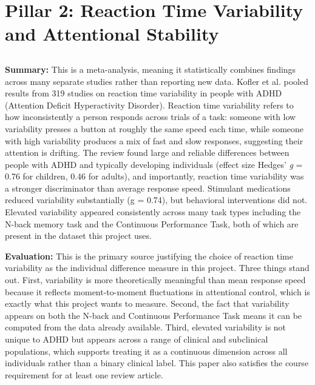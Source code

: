 \documentclass[12pt]{article}
\begin{document}
\section*{Pillar 2: Reaction Time Variability and Attentional Stability}

\subsection*{\cite{kofler2013}}
\textbf{Summary:} This is a meta-analysis, meaning it statistically combines findings across many separate studies rather than reporting new data. Kofler et al. pooled results from 319 studies on reaction time variability in people with ADHD (Attention Deficit Hyperactivity Disorder). Reaction time variability refers to how inconsistently a person responds across trials of a task: someone with low variability presses a button at roughly the same speed each time, while someone with high variability produces a mix of fast and slow responses, suggesting their attention is drifting. The review found large and reliable differences between people with ADHD and typically developing individuals (effect size Hedges' \textit{g} = 0.76 for children, 0.46 for adults), and importantly, reaction time variability was a stronger discriminator than average response speed. Stimulant medications reduced variability substantially (g = 0.74), but behavioral interventions did not. Elevated variability appeared consistently across many task types including the N-back memory task and the Continuous Performance Task, both of which are present in the dataset this project uses.

\textbf{Evaluation:} This is the primary source justifying the choice of reaction time variability as the individual difference measure in this project. Three things stand out. First, variability is more theoretically meaningful than mean response speed because it reflects moment-to-moment fluctuations in attentional control, which is exactly what this project wants to measure. Second, the fact that variability appears on both the N-back and Continuous Performance Task means it can be computed from the data already available. Third, elevated variability is not unique to ADHD but appears across a range of clinical and subclinical populations, which supports treating it as a continuous dimension across all individuals rather than a binary clinical label. This paper also satisfies the course requirement for at least one review article.
\end{document}
